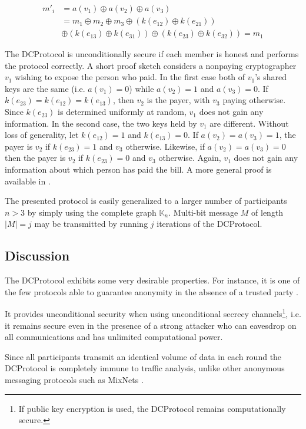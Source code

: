\begin{align*}
m'_i &= a(v_1) \oplus a(v_2) \oplus a(v_3) \\
     &= m_1 \oplus m_2 \oplus m_3
     \oplus (k(e_{12}) \oplus k(e_{21})) \\
     & \oplus (k(e_{13}) \oplus k(e_{31})) 
     \oplus (k(e_{23}) \oplus k(e_{32})) = m_1
\end{align*}

The \ac{DCProtocol} is unconditionally secure if each member is honest and performs the
protocol correctly. A short proof sketch considers a nonpaying cryptographer $v_1$
wishing to expose the person who paid. In the first case both of $v_1$'s shared keys are the same
(i.e. $a(v_1) = 0$) while $a(v_2) = 1$ and $a(v_3) = 0$. If $k(e_{23}) = k(e_{12}) = k(e_{13})$, then $v_2$
is the payer, with $v_3$ paying otherwise. Since $k(e_{23})$ is determined uniformly at random,
$v_1$ does not gain any information. In the second case, the two keys held by $v_1$ are different.
Without loss of generality, let $k(e_{12}) = 1$ and $k(e_{13}) = 0$.
If $a(v_2) = a(v_3) = 1$, the payer is $v_2$ if $k(e_{23}) = 1$ and $v_3$ otherwise.
Likewise, if $a(v_2) = a(v_3) = 0$ then the payer is $v_2$ if $k(e_{23}) = 0$ and $v_3$ otherwise.
Again, $v_1$ does not gain any information about which person has paid the bill.
A more general proof is available in \cite{journals/joc/Chaum88}.

The presented protocol is easily generalized to a larger number of participants $n > 3$ by simply
using the complete graph $\mathbb{K}_n$. Multi-bit message $M$ of length $|M| = j$
may be transmitted by running $j$ iterations of the \ac{DCProtocol}.  


\subsection{Discussion}

The \ac{DCProtocol} exhibits some very desirable properties. For instance, it is one of the few
protocols able to guarantee anonymity in the absence of a trusted party \cite{juels2004dining}.

It provides unconditional security when using unconditional secrecy channels\footnote{
If public key encryption is used, the \ac{DCProtocol} remains computationally secure.},
i.e. it remains secure even in the presence of a
strong attacker who can eavesdrop on all communications and has unlimited computational power.

Since all participants transmit an identical volume of data in each round the \ac{DCProtocol}
is completely immune to traffic analysis, unlike other anonymous messaging protocols such
as \acp{MixNet} \cite{journals/cacm/Chaum81}.

